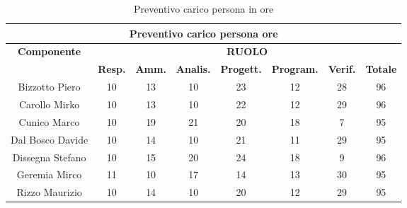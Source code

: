 \begin{table}[!h]
	\begin{center}
		  \begin{tabular}
			  {|c|c|c|c|c|c|c|c|}
		 \hline
			\multicolumn{8}{|c|}{ \textbf{Preventivo carico persona ore} } \\
			\hline
			\textbf{Componente} & \multicolumn{7}{|c|}{ \textbf{RUOLO} } \\
			\hline
			& \textbf{Resp.} & \textbf{Amm.} & \textbf{Analis.} & \textbf{Progett.} & \textbf{Program.} & \textbf{Verif.}  & \textbf{Totale}\\
			\hline
			Bizzotto Piero       &  10   &  13  &  10   &   23  &  12   &  28   &  96\\ %
			\hline
			Carollo Mirko        &  10   &  13  &  10   &   22  &  12   &  29  &  96\\ %
			\hline
			Cunico Marco         &  10   &  19  &  21   &   20  &  18   &  7  &   95\\ %
			\hline
			Dal Bosco Davide     &  10   &  14  &  10   &   21  &  11   &  29  &  95\\ %
			\hline
			Dissegna Stefano     &  10   &  15  &  20   &   24  &  18   &  9  &  96\\ %
			\hline
			Geremia Mirco        &  11   &  10  &  17   &   14  &  13   &  30  &  95\\ %
			\hline		
			Rizzo Maurizio       &  10   &  14  &  10   &   20  &  12   &  29  &  95\\
			\hline
		\end{tabular}
	\caption{Preventivo carico persona in ore} %
	\label{tab:TabellaPrevPersOre}
	\end{center}	
\end{table}

